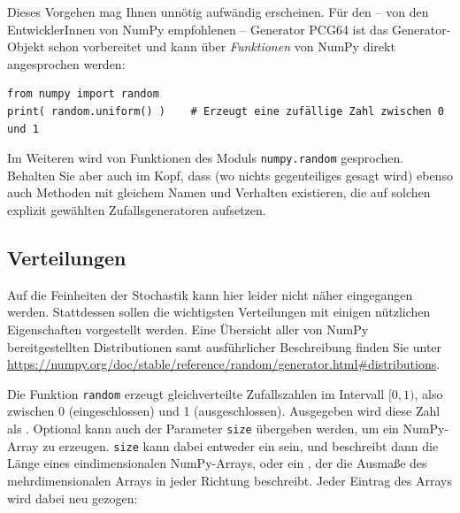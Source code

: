 Dieses Vorgehen mag Ihnen unnötig aufwändig erscheinen. Für den -- von den EntwicklerInnen von NumPy empfohlenen -- Generator PCG64 ist das Generator-Objekt schon vorbereitet und kann über \emph{Funktionen} von NumPy direkt angesprochen werden:

\begin{codebox}
\begin{verbatim}
from numpy import random
print( random.uniform() )    # Erzeugt eine zufällige Zahl zwischen 0 und 1
\end{verbatim}
\end{codebox}

Im Weiteren wird von Funktionen des Moduls \texttt{numpy.random} gesprochen. Behalten Sie aber auch im Kopf, dass (wo nichts gegenteiliges gesagt wird) ebenso auch Methoden mit gleichem Namen und Verhalten existieren, die auf solchen explizit gewählten Zufallsgeneratoren aufsetzen.

\subsection{Verteilungen}
Auf die Feinheiten der Stochastik kann hier leider nicht näher eingegangen werden. Stattdessen sollen die wichtigsten Verteilungen mit einigen nützlichen Eigenschaften vorgestellt werden. Eine Übersicht aller von NumPy bereitgestellten Distributionen samt ausführlicher Beschreibung finden Sie unter \url{https://numpy.org/doc/stable/reference/random/generator.html#distributions}.

Die Funktion \texttt{random} erzeugt gleichverteilte Zufallszahlen im Intervall $[0, 1)$, also zwischen 0 (eingeschlossen) und 1 (ausgeschlossen). Ausgegeben wird diese Zahl als . Optional kann auch der Parameter \texttt{size} übergeben werden, um ein NumPy-Array zu erzeugen. \texttt{size} kann dabei entweder ein  sein, und beschreibt dann die Länge eines eindimensionalen NumPy-Arrays, oder ein , der die Ausmaße des mehrdimensionalen Arrays in jeder Richtung beschreibt. Jeder Eintrag des Arrays wird dabei neu gezogen:

